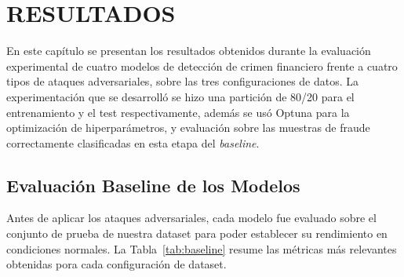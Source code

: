 \chapter{RESULTADOS}

En este capítulo se presentan los resultados obtenidos durante la evaluación experimental de cuatro modelos de detección de crimen financiero frente a cuatro tipos de ataques adversariales, sobre las tres configuraciones de datos. La experimentación que se desarrolló se hizo una partición de 80/20 para el entrenamiento y el test respectivamente, además se usó Optuna para la optimización de hiperparámetros, y evaluación sobre las muestras de fraude correctamente clasificadas en esta etapa del \textit{baseline}.

% 
\section{Evaluación Baseline de los Modelos}
% 

Antes de aplicar los ataques adversariales, cada modelo fue evaluado sobre el conjunto de prueba de nuestra dataset para poder establecer su rendimiento en condiciones normales. La Tabla~\ref{tab:baseline} resume las métricas más relevantes obtenidas pora cada configuración de dataset.

\begin{table}[H]
\centering
\caption{Métricas baseline de los modelos por configuración de dataset}
\label{tab:baseline}
\end{table}

